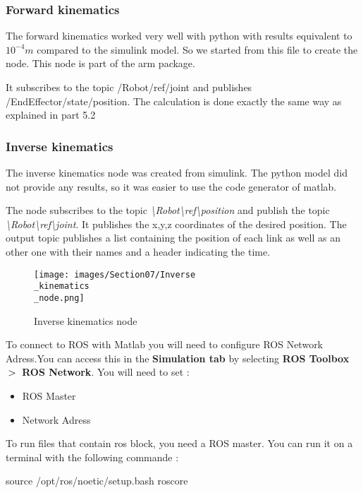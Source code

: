 \subsubsection{Forward kinematics}

The forward kinematics worked very well with python with results equivalent to $10^{-4}m$ compared to the simulink model. So we started from this file to create the node. This node is part of the arm package. 

\bigbreak
It subscribes to the topic /Robot/ref/joint and publishes /EndEffector/state/position. The calculation is done exactly the same way as explained in part 5.2

\subsubsection{Inverse kinematics}

The inverse kinematics node was created from simulink. The python model did not provide any results, so it was easier to use the code generator of matlab.

\bigbreak
The node subscribes to the topic \textit{\textbackslash Robot\textbackslash ref\textbackslash position} and publish the topic \textit{\textbackslash Robot\textbackslash ref\textbackslash joint}. It publishes the x,y,z coordinates of the desired position. The output topic publishes a list containing the position of each link as well as an other one with their names and a header indicating the time.
\bigbreak
\begin{figure}[ht]
    \centering
    \texttt{[image: images/Section07/Inverse\\\_kinematics\\\_node.png]}
    \caption{Inverse kinematics node}
    \label{fig:mesh21}
\end{figure}
\FloatBarrier

\bigbreak
To connect to ROS with Matlab you will need to configure ROS Network Adress.You can access this in the \textbf{Simulation tab} by selecting \textbf{ROS Toolbox} $\bg$ \textbf{ROS Network}. You will need to set :
\begin{multicols}{2}
    \begin{itemize}[noitemsep]
        \item ROS Master
        \item Network Adress
    \end{itemize}
\end{multicols}

\bigbreak
To run files that contain ros block, you need a ROS master. You can run it on a terminal with the following commande :
\begin{commandshell}
    source /opt/ros/noetic/setup.bash
    roscore
\end{commandshell} 

